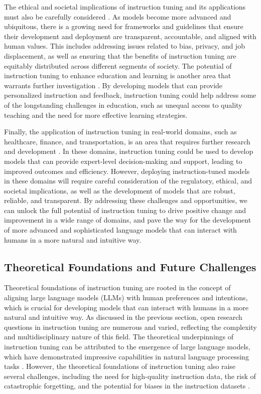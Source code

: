 \documentclass[11pt]{article}
\begin{document}
The ethical and societal implications of instruction tuning and its applications must also be carefully considered \cite{ref145}. As models become more advanced and ubiquitous, there is a growing need for frameworks and guidelines that ensure their development and deployment are transparent, accountable, and aligned with human values. This includes addressing issues related to bias, privacy, and job displacement, as well as ensuring that the benefits of instruction tuning are equitably distributed across different segments of society. The potential of instruction tuning to enhance education and learning is another area that warrants further investigation \cite{ref146}. By developing models that can provide personalized instruction and feedback, instruction tuning could help address some of the longstanding challenges in education, such as unequal access to quality teaching and the need for more effective learning strategies.

Finally, the application of instruction tuning in real-world domains, such as healthcare, finance, and transportation, is an area that requires further research and development \cite{ref147}. In these domains, instruction tuning could be used to develop models that can provide expert-level decision-making and support, leading to improved outcomes and efficiency. However, deploying instruction-tuned models in these domains will require careful consideration of the regulatory, ethical, and societal implications, as well as the development of models that are robust, reliable, and transparent. By addressing these challenges and opportunities, we can unlock the full potential of instruction tuning to drive positive change and improvement in a wide range of domains, and pave the way for the development of more advanced and sophisticated language models that can interact with humans in a more natural and intuitive way.

\subsection{Theoretical Foundations and Future Challenges}

Theoretical foundations of instruction tuning are rooted in the concept of aligning large language models (LLMs) with human preferences and intentions, which is crucial for developing models that can interact with humans in a more natural and intuitive way. As discussed in the previous section, open research questions in instruction tuning are numerous and varied, reflecting the complexity and multidisciplinary nature of this field. The theoretical underpinnings of instruction tuning can be attributed to the emergence of large language models, which have demonstrated impressive capabilities in natural language processing tasks \cite{ref33}. However, the theoretical foundations of instruction tuning also raise several challenges, including the need for high-quality instruction data, the risk of catastrophic forgetting, and the potential for biases in the instruction datasets \cite{ref29}.
\end{document}

